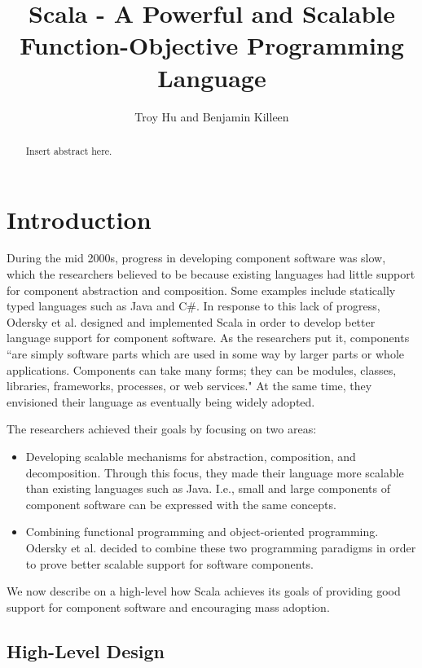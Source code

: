 \documentclass[jou,apacite]{IEEEtran}
\title{Scala - A Powerful and Scalable Function-Objective Programming Language}
\author{Troy Hu and Benjamin Killeen} %
\begin{document}
\maketitle    
\begin{abstract}
Insert abstract here.
\end{abstract}                     

\section{Introduction}
\label{sec:intro}

During the mid 2000s, progress in developing component software was slow, which the researchers believed to be because existing languages had little support for component abstraction and composition. Some examples include statically typed languages such as Java and C\#. In response to this lack of progress, Odersky et al. designed and implemented Scala in order to develop better language support for component software. As the researchers put it, components ``are simply software parts which are used in some way by larger parts or whole applications. Components can take many forms; they can be modules, classes, libraries, frameworks, processes, or web services." At the same time, they envisioned their language as eventually being widely adopted. 


The researchers achieved their goals by focusing on two areas: 
\begin{itemize}
\item Developing scalable mechanisms for abstraction, composition, and
  decomposition. Through this focus, they made their language more scalable
  than existing languages such as Java. I.e., small and large components of
  component software can be expressed with the same concepts.
\item Combining functional programming and object-oriented
  programming. Odersky et al. decided to combine these two programming
  paradigms in order to prove better scalable support for software
  components.
\end{itemize}
We now describe on a high-level how Scala achieves its goals of providing
good support for component software and encouraging mass adoption.

\subsection{High-Level Design}
\label{sec:high-level-design}
\end{document}

